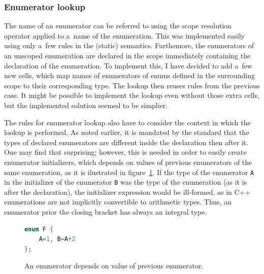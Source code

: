 \documentclass{fithesis3}
\begin{document}


\subsubsection{Enumerator lookup}

The name of an enumerator can be referred to using the scope resolution operator applied to a~name of the enumeration. This was implemented easily using only a~few rules in the (static) semantics.
Furthemore, the enumerators of an unscoped enumeration are declared in the scope immediately containing the declaration of the enumeration. To implement this, I have decided to add a~few new cells, which map names of enumerators of enums defined in the surrounding scope to their corresponding type. The lookup then reuses rules from the previous case. It might be possible to implement the lookup even without those extra cells, but the implemented solution seemed to be simplier.

The rules for enumerator lookup also have to consider the context in which the lookup is performed. As noted earlier, it is mandated by the standard that the types of declared enumerators are different inside the declaration then after it. One may find that surprising; however, this is needed in order to easily create enumerator initializers, which depends on values of previous enumerators of the same enumeration, as it is ilustrated in figure~\ref{lst:enumDepends}. If the type of the enumerator \lstinline{A} in the initializer of the enumerator \lstinline{B} was the type of the enumeration (as it is after the declaration), the initializer expression would be ill-formed, as in C++ enumerations are not implicitly convertible to arithmetic types. Thus, an enumerator prior the closing bracket has always an integral type.



\begin{figure}[h]
\begin{lstlisting}[language=C++]
enum F {
	A=1, B=A+2
};
\end{lstlisting}
\caption{An enumerator depends on value of previous enumerator.}
\label{lst:enumDepends}
\end{figure}
\end{document}
